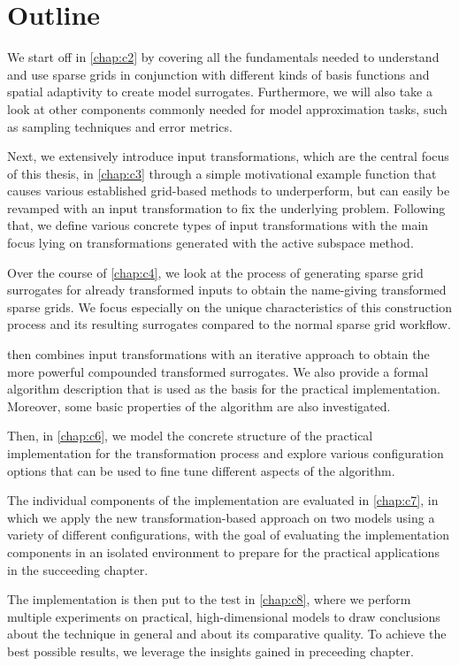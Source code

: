 \documentclass[
  a4paper,  %
  twoside,  %
  bibliography=totoc,
  headsepline,
  cleardoublepage=empty,
  parskip=half,
  draft=false
]{scrbook}
\begin{document}
\section{Outline}

We start off in \cref{chap:c2} by covering all the fundamentals needed to understand and use sparse grids in conjunction with different kinds of basis functions and spatial adaptivity to create model surrogates.
Furthermore, we will also take a look at other components commonly needed for model approximation tasks, such as sampling techniques and error metrics.

Next, we extensively introduce input transformations, which are the central focus of this thesis, in \cref{chap:c3} through a simple motivational example function that causes various established grid-based methods to underperform, but can easily be revamped with an input transformation to fix the underlying problem.
Following that, we define various concrete types of input transformations with the main focus lying on transformations generated with the active subspace method.

Over the course of \cref{chap:c4}, we look at the process of generating sparse grid surrogates for already transformed inputs to obtain the name-giving transformed sparse grids.
We focus especially on the unique characteristics of this construction process and its resulting surrogates compared to the normal sparse grid workflow.

 then combines input transformations with an iterative approach to obtain the more powerful compounded transformed surrogates.
We also provide a formal algorithm description that is used as the basis for the practical implementation.
Moreover, some basic properties of the algorithm are also investigated.

Then, in \cref{chap:c6}, we model the concrete structure of the practical implementation for the transformation process and explore various configuration options that can be used to fine tune different aspects of the algorithm.

The individual components of the implementation are evaluated in \cref{chap:c7}, in which we apply the new transformation-based approach on two models using a variety of different configurations, with the goal of evaluating the implementation components in an isolated environment to prepare for the practical applications in the succeeding chapter.

The implementation is then put to the test in \cref{chap:c8}, where we perform multiple experiments on practical, high-dimensional models to draw conclusions about the technique in general and about its comparative quality.
To achieve the best possible results, we leverage the insights gained in preceeding chapter.
\end{document}

